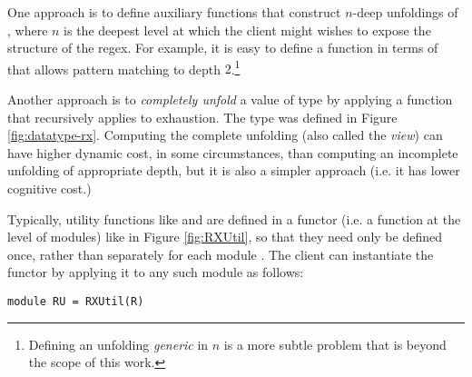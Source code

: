 One approach is to define auxiliary functions that construct $n$-deep unfoldings of , where $n$ is the deepest level at which the client might wishes to expose the structure of the regex. For example, it is easy to define a function  in terms of  that allows pattern matching to depth $2$.\footnote{Defining an unfolding \emph{generic} in $n$ is a more subtle problem that is beyond the scope of this work.} 

Another approach is to \emph{completely unfold} a value of type  by applying a function  that recursively applies  to exhaustion. The type  was defined in Figure \ref{fig:datatype-rx}.  Computing the complete unfolding (also called the \emph{view}) can have higher dynamic cost, in some circumstances, than computing an incomplete unfolding of appropriate depth, but it is also a simpler approach (i.e. it has lower cognitive cost.)

Typically, utility functions like  and  are defined in a functor (i.e. a function at the level of modules) like  in Figure \ref{fig:RXUtil}, so that they need only be defined once, rather than separately for each module . The client can instantiate the functor by applying it to any such module as follows:
\begin{lstlisting}[numbers=none]
module RU = RXUtil(R)
\end{lstlisting}


